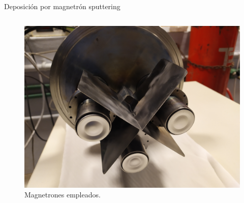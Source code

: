 \documentclass[11pt]{beamer}
\begin{document}
\begin{frame}{Deposición por magnetrón sputtering}
\begin{columns}[T]
\begin{column}{.58\textwidth}
\begin{figure}[H]
					\includegraphics[scale=0.04]{img/magnetrones.jpg}
					\caption*{Magnetrones empleados.}
					\end{figure}
				\end{column}
			\end{columns}
		\end{frame}
		
\end{document}
